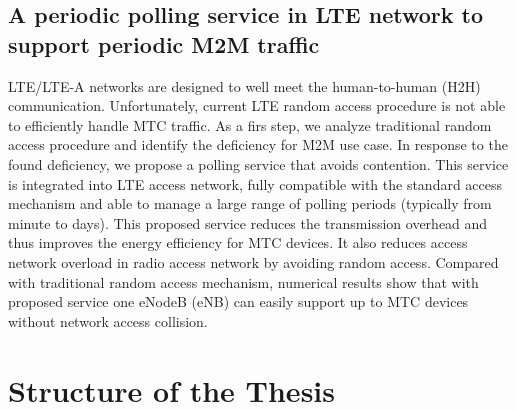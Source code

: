 \subsection{A periodic polling service in LTE network to support periodic M2M traffic}
LTE/LTE-A networks are designed to well meet the human-to-human (H2H) communication. Unfortunately, current LTE random access procedure is not able to efficiently handle MTC traffic. As a firs step, we analyze traditional random access procedure and identify the deficiency for M2M use case. In response to the found deficiency, we propose a polling service that avoids contention. This service is integrated into LTE access network, fully compatible with the standard access mechanism and able to manage a large range of polling periods (typically from  minute to  days).
This proposed service reduces the transmission overhead and thus improves the energy efficiency for MTC devices. It also reduces access network overload in radio access network by avoiding random access. 
Compared with traditional random access mechanism, numerical results show that with proposed service one eNodeB (eNB) can easily support up to  MTC devices without network access collision.  

\section{Structure of the Thesis}  %


